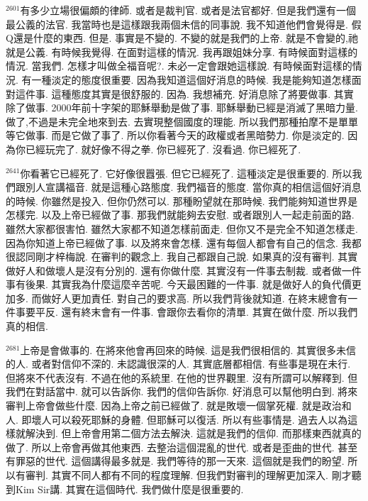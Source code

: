 \documentclass{book}
\begin{document}
$^{2601}$有多少立場很偏頗的律師.
或者是裁判官.
或者是法官都好.
但是我們還有一個最公義的法官.
我當時也是這樣跟我兩個未信的同事說.
我不知道他們會覺得是.
假Q還是什麼的東西.
但是.
事實是不變的.
不變的就是我們的上帝.
就是不會變的,祂就是公義.
有時候我覺得.
在面對這樣的情況.
我再跟姐妹分享.
有時候面對這樣的情況.
當我們.
怎樣才叫做全福音呢?.
未必一定會跟她這樣說.
有時候面對這樣的情況.
有一種淡定的態度很重要.
因為我知道這個好消息的時候.
我是能夠知道怎樣面對這件事.
這種態度其實是很舒服的.
因為.
我想補充.
好消息除了將要做事.
其實除了做事.
2000年前十字架的耶穌舉動是做了事.
耶穌舉動已經是消滅了黑暗力量.
做了,不過是未完全地來到去.
去實現整個國度的理能.
所以我們那種拍摩不是單單等它做事.
而是它做了事了.
所以你看著今天的政權或者黑暗勢力.
你是淡定的.
因為你已經玩完了.
就好像不得之拳.
你已經死了.
沒看過.
你已經死了.

$^{2641}$你看著它已經死了.
它好像很囂張.
但它已經死了.
這種淡定是很重要的.
所以我們跟別人宣講福音.
就是這種心路態度.
我們福音的態度.
當你真的相信這個好消息的時候.
你雖然是投入.
但你仍然可以.
那種盼望就在那時候.
我們能夠知道世界是怎樣完.
以及上帝已經做了事.
那我們就能夠去安慰.
或者跟別人一起走前面的路.
雖然大家都很害怕.
雖然大家都不知道怎樣前面走.
但你又不是完全不知道怎樣走.
因為你知道上帝已經做了事.
以及將來會怎樣.
還有每個人都會有自己的信念.
我都很認同剛才梓梅說.
在審判的觀念上.
我自己都跟自己說.
如果真的沒有審判.
其實做好人和做壞人是沒有分別的.
還有你做什麼.
其實沒有一件事去制裁.
或者做一件事有後果.
其實我為什麼這麼辛苦呢.
今天最困難的一件事.
就是做好人的負代價更加多.
而做好人更加責任.
對自己的要求高.
所以我們背後就知道.
在終末總會有一件事要平反.
還有終末會有一件事.
會跟你去看你的清單.
其實在做什麼.
所以我們真的相信.

$^{2681}$上帝是會做事的.
在將來他會再回來的時候.
這是我們很相信的.
其實很多未信的人.
或者對信仰不深的.
未認識很深的人.
其實底層都相信.
有些事是現在未行.
但將來不代表沒有.
不過在他的系統里.
在他的世界觀里.
沒有所謂可以解釋到.
但我們在對話當中.
就可以告訴你.
我們的信仰告訴你.
好消息可以幫他明白到.
將來審判上帝會做些什麼.
因為上帝之前已經做了.
就是敗壞一個掌死權.
就是政治和人.
即壞人可以殺死耶穌的身體.
但耶穌可以復活.
所以有些事情是.
過去人以為這樣就解決到.
但上帝會用第二個方法去解決.
這就是我們的信仰.
而那樣東西就真的做了.
所以上帝會再做其他東西.
去整治這個混亂的世代.
或者是歪曲的世代.
甚至有罪惡的世代.
這個講得最多就是.
我們等待的那一天來.
這個就是我們的盼望.
所以有審判.
其實不同人都有不同的程度理解.
但我們對審判的理解更加深入.
剛才聽到Kim Sir講.
其實在這個時代.
我們做什麼是很重要的.
\end{document}
